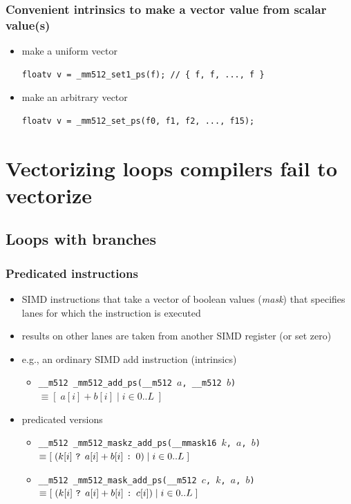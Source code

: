 \documentclass[12pt,dvipdfmx]{beamer}
\newcommand{\ao}[1]{{\color{blue}#1}}
\begin{document}
\begin{frame}[fragile]
  \frametitle{Convenient intrinsics to make a vector value from scalar value(s)}
  \begin{itemize}
\item make a uniform vector
\begin{lstlisting}
floatv v = _mm512_set1_ps(f); // { f, f, ..., f }
\end{lstlisting}
\item make an arbitrary vector
\begin{lstlisting}
floatv v = _mm512_set_ps(f0, f1, f2, ..., f15);
\end{lstlisting}
\end{itemize}
\end{frame}

\section{Vectorizing loops compilers fail to vectorize}
\subsection{Loops with branches}

\begin{frame}
  \frametitle{Predicated instructions}
  \begin{itemize}
  \item SIMD instructions that take a vector of boolean values (\ao{\it mask})
    that specifies lanes for which the instruction is executed
  \item results on other lanes are taken from another SIMD register (or set zero)
  \item e.g., an ordinary SIMD add instruction (intrinsics)
    \begin{itemize}
    \item {\tt \_\_m512 \_mm512\_add\_ps(\_\_m512 $a$, \_\_m512 $b$)}
      $\equiv  [\; a[i] + b[i] \;|\; i \in 0..L\; ]$
    \end{itemize}
  \item predicated versions    
    \begin{itemize}
    \item {\tt \_\_m512 \_mm512\_maskz\_add\_ps(\_\_mmask16 $k$, $a$, $b$)} $\equiv [\; (k[i] \mbox{ {\tt ?} } a[i] + b[i] \mbox{ {\tt :} } 0) \;|\; i \in 0..L \;]$
    \item {\tt \_\_m512 \_mm512\_mask\_add\_ps(\_\_m512 $c$, $k$, $a$, $b$)} $\equiv [\;(k[i] \mbox{ {\tt ?} } a[i] + b[i] \mbox{ {\tt :} } c[i]) \;|\; i \in 0..L\;]$
    \end{itemize}
  \end{itemize}
\end{frame}
\end{document}
